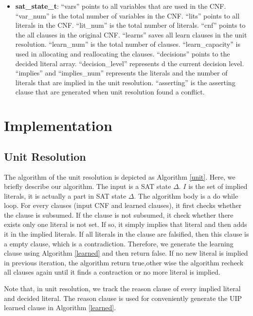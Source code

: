 \documentclass[11pt]{llncs}
\begin{document}
\begin{itemize}
  \item \textbf{sat\_state\_t}: ``vars'' points to all variables that are used in the CNF.
  ``var\_num'' is the total number of variables in the CNF.
  ``lits'' points to all literals in the CNF.
  ``lit\_num'' is the total number of literals.
  ``cnf'' points to the all clauses in the original CNF.
  ``learns'' saves all learn clauses in the unit resolution.
  ``learn\_num'' is the total number of clauses.
  ``learn\_capacity'' is used in allocating and reallocating the clauses.
  ``decisions'' points to the decided literal array.
  ``decision\_level'' represents d the current decision level.
  ``implies'' and ``implies\_num'' represents the literals and the number of literals that are implied in the unit resolution.
  ``asserting'' is the asserting clause that are generated when unit resolution found a conflict.
\end{itemize}


\section{Implementation}

\subsection{Unit Resolution}

The algorithm of the unit resolution is depicted as Algorithm \ref{unit}.
Here, we briefly describe our algorithm.
The input is a SAT state $\Delta$.
$I$ is the set of implied literals, it is actually a part in SAT state $\Delta$.
The algorithm body is a do while loop.
For every clauses (input CNF and learned clauses), it first checks whether the clause is subsumed.
If the clause is not subsumed, it check whether there exists only one literal is not set.
If so, it simply implies that literal and then adds it in the implied literals.
If all literals in the clause are falsified, then this clause is a empty clause, which is a contradiction.
Therefore, we generate the learning clause using Algorithm \ref{learned} and then return false.
If no new literal is implied in previous iteration, the algorithm return true,other wise the algorithm recheck all clauses again until it finds a contraction or no more literal is implied.


Note that, in unit resolution, we track the reason clause of every implied literal and decided literal.
The reason clause is used for conveniently generate the UIP learned clause in Algorithm \ref{learned}.
\end{document}
